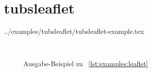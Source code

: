 {%

\clearpage
\section{tubsleaflet}

    {../examples/tubsleaflet/tubsleaflet-example.tex}
  
    \begin{figure}
    \begin{minipage}{\textwidth}\centering
    \end{minipage}\\[1ex]
    \begin{minipage}{\textwidth}\centering
    \end{minipage}
    \caption{Ausgabe-Beispiel zu \lstlistingname~\ref{lst:examples:leaflet}}
    \label{fig:examples:leaflet}
  \end{figure}

}
